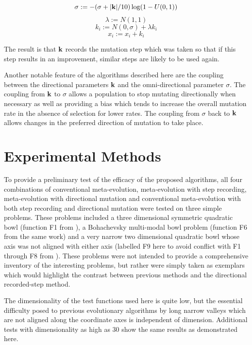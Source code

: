 \documentclass[12pt, titlepage]{article}
\begin{document}
\begin{displaymath}
\sigma := - (\sigma + |{\bf k}|/10) \log (1-U(0,1))
\end{displaymath}
\begin{displaymath}
\lambda := N(1,1)
\end{displaymath}
\begin{displaymath}
k_i := N(0, \sigma) + \lambda k_i 
\end{displaymath}
\begin{displaymath}
x_i := x_i + k_i 
\end{displaymath}

The result is that $\bf k$ records the mutation step which was taken
so that if this step results in an improvement, similar steps are
likely to be used again.

Another notable feature of the algorithms described here are the
coupling between the directional parameters ${\bf k}$ and the
omni-directional parameter $\sigma$.  The coupling from ${\bf k}$ to
$\sigma$ allows a population to stop mutating directionally when
necessary as well as providing a bias which tends to increase the
overall mutation rate in the absence of selection for lower rates.
The coupling from $\sigma$ back to ${\bf k}$ allows changes in the
preferred direction of mutation to take place.

\section{Experimental Methods}

To provide a preliminary test of the efficacy of the proposed
algorithms, all four combinations of conventional meta-evolution,
meta-evolution with step recording, meta-evolution with directional
mutation and conventional meta-evolution with both step recording and
directional mutation were tested on three simple problems.  These
problems included a three dimensional symmetric quadratic bowl
(function F1 from \cite{fogel94}), a Bohachevsky multi-modal bowl
problem (function F6 from the same work) and a very narrow two
dimensional quadratic bowl whose axis was not aligned with either axis
(labelled F9 here to avoid conflict with F1 through F8 from
\cite{fogel94}).  These problems were not intended to provide a
comprehensive inventory of the interesting problems, but rather were
simply taken as exemplars which would highlight the contrast between
previous methods and the directional recorded-step method.  

The dimensionality of the test functions used here is quite low, but
the essential difficulty posed to previous evolutionary algorithms by
long narrow valleys which are not aligned along the coordinate axes is
independent of dimension.  Additional tests with dimensionality as
high as 30 show the same results as demonstrated here.
\end{document}
